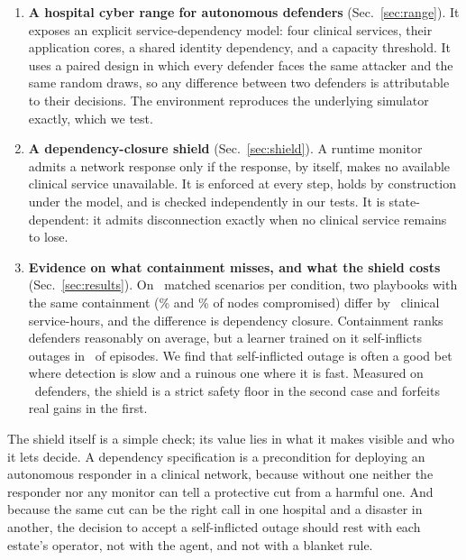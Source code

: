 \documentclass[conference,compsoc]{IEEEtran}
\begin{document}
\begin{enumerate}
\item \textbf{A hospital cyber range for autonomous defenders}
(Sec.~\ref{sec:range}). It exposes an explicit service-dependency model:
four clinical services, their application cores, a shared identity
dependency, and a capacity threshold. It uses a paired design in which
every defender faces the same attacker and the same random draws, so any
difference between two defenders is attributable to their decisions. The
environment reproduces the underlying simulator exactly, which we test.

\item \textbf{A dependency-closure shield} (Sec.~\ref{sec:shield}). A
runtime monitor admits a network response only if the response, by
itself, makes no available clinical service unavailable. It is enforced at
every step, holds by construction under the model, and is checked
independently in our tests. It is state-dependent: it admits disconnection
exactly when no clinical service remains to lose.

\item \textbf{Evidence on what containment misses, and what the shield
costs} (Sec.~\ref{sec:results}). On \numEvalScenarios\ matched scenarios
per condition, two playbooks with the same containment
(\numDisconnectSpread\% and \numIslandsSpread\% of nodes compromised) differ
by \numKeyDisconnectToIslandsHoursAbs\ clinical service-hours, and the
difference is dependency closure. Containment ranks defenders reasonably
on average, but a learner trained on it self-inflicts outages in
\numQContainmentTodaySelfPct\ of episodes. We find that self-inflicted outage is often a good bet where
detection is slow and a ruinous one where it is fast. Measured on
\numPosthocDefenders\ defenders, the shield is a strict safety floor in the second case and
forfeits real gains in the first.
\end{enumerate}

The shield itself is a simple check; its value lies in what it makes
visible and who it lets decide. A dependency specification is a
precondition for deploying an autonomous responder in a clinical network,
because without one neither the responder nor any monitor can tell a
protective cut from a harmful one. And because the same cut can be the
right call in one hospital and a disaster in another, the decision to
accept a self-inflicted outage should rest with each estate's operator,
not with the agent, and not with a blanket rule.
\end{document}
